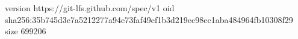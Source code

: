 version https://git-lfs.github.com/spec/v1
oid sha256:35b745d3e7a5212277a94e73faf49ef1b3d219ec98ec1aba484964fb10308f29
size 699206
